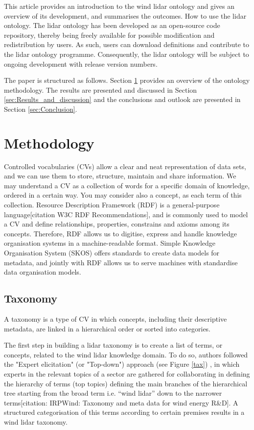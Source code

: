 \documentclass[remotesensing,article,submit,pdftex,moreauthors]{Definitions/mdpi}
\begin{document}
This article provides an introduction to the wind lidar ontology and gives an overview of its development, and summarises the outcomes.
How to use the lidar ontology. The lidar ontology has been developed as an open-source code repository, thereby  being freely available for possible modification and redistribution by users.
As such, users can download definitions and contribute to the lidar ontology programme.
Consequently, the lidar ontology will be subject to ongoing development with release version numbers.

The paper is structured as follows. Section \ref{sec:Methodology} provides an overview of the ontology methodology. The results are presented and discussed in Section \ref{sec:Results_and_discussion} and the conclusions and outlook are presented in Section \ref{sec:Conclusion}.


\section{Methodology}
\label{sec:Methodology}
 Controlled vocabularies (CVs) allow a clear and neat representation of data sets, and we can use them to store, structure, maintain and share information. We may understand a CV as a collection of words for a specific domain of knowledge, ordered in a certain way. You may consider also a concept, as each term of this collection. Resource Description Framework (RDF) is a general-purpose language[citation W3C RDF Recommendations], and is commonly used to model a CV and define relationships, properties, constrains and axioms among its concepts. Therefore, RDF allows us to digitise, express and handle knowledge organisation systems in a machine-readable format. Simple Knowledge Organisation System (SKOS) offers standards to create data models for metadata, and jointly with RDF allows us to serve machines with standardise data organisation models.

\subsection{Taxonomy}

A taxonomy is a type of CV in which concepts, including their descriptive metadata,  are linked in a hierarchical order or sorted into categories.

The first step in building a lidar taxonomy is to create a list of terms, or concepts, related to the wind lidar knowledge domain. To do so, authors followed the "Expert elicitation" (or "Top-down") approach (see Figure \ref{tax}) , in which experts in the relevant topics of a sector are gathered for collaborating in defining the hierarchy of terms (top topics) defining the main branches of the hierarchical  tree starting  from the broad term  i.e.  “wind lidar” down to the narrower terms[citation: IRPWind: Taxonomy and meta data for wind energy R&D]. A structured categorisation of this terms according to certain premises results in a wind lidar taxonomy. 
\end{document}
